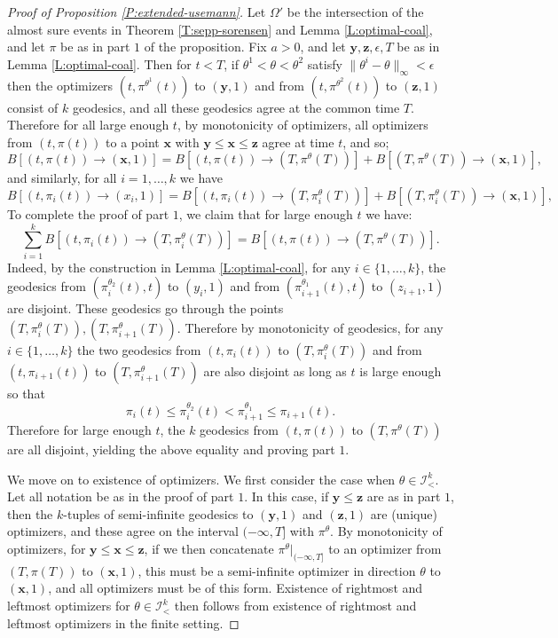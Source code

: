 \documentclass[11pt]{article}
\newcommand{\ep}{\epsilon}
\newcommand{\Om}{\Omega}
\newcommand{\cI}{\mathcal{I}}
\newcommand{\bx}{\mathbf{x}}
\newcommand{\by}{\mathbf{y}}
\newcommand{\bz}{\mathbf{z}}
\theoremstyle{definition} %
\theoremstyle{remark} %
\begin{document}
\begin{proof}[Proof of Proposition \ref{P:extended-usemann}]
	Let $\Om'$ be the intersection of the almost sure events in Theorem \ref{T:sepp-sorensen} and Lemma \ref{L:optimal-coal}, and let $\pi$ be as in part $1$ of the proposition. Fix $a > 0$, and let $\by, \bz, \ep, T$ be as in Lemma \ref{L:optimal-coal}. Then for $t < T$, if $\theta^1 < \theta < \theta^2$ satisfy $\|\theta^i - \theta\|_\infty < \ep$ then the optimizers $(t, \pi^{\theta^1}(t))$ to $(\by, 1)$ and from $(t, \pi^{\theta^2}(t))$ to $(\bz, 1)$ consist of $k$ geodesics, and all these geodesics agree at the common time $T$. Therefore for all large enough $t$, by monotonicity of optimizers, all optimizers from $(t, \pi(t))$ to a point $\bx$ with $\by \le \bx \le \bz$ agree at time $t$, and so;
	$$
	B[(t, \pi(t)) \to (\bx, 1)]  = B[(t, \pi(t)) \to (T, \pi^{\theta}(T))] + B[(T, \pi^{\theta}(T)) \to (\bx, 1)],
	$$
	and similarly, for all $i = 1, \dots, k$ we have
	$$
	B[(t, \pi_i(t)) \to (x_i, 1)]  = B[(t, \pi_i(t)) \to (T, \pi^{\theta}_i(T))] + B[(T, \pi^{\theta}_i(T)) \to (\bx, 1)],
	$$
	To complete the proof of part $1$, we claim that for large enough $t$ we have:
	$$
	\sum_{i=1}^k B[(t, \pi_i(t)) \to (T, \pi^{\theta}_i(T))] = B[(t, \pi(t)) \to (T, \pi^{\theta}(T))].
	$$
	Indeed, by the construction in Lemma \ref{L:optimal-coal}, for any $i \in \{1, \dots, k\}$, the geodesics from  $(\pi^{\theta_2}_i(t), t)$ to $(y_i, 1)$ and from $(\pi^{\theta_1}_{i+1}(t), t)$ to $(z_{i+1}, 1)$ are disjoint. These geodesics go through the points $(T, \pi^{\theta}_i(T)), (T, \pi^{\theta}_{i+1}(T))$. Therefore by monotonicity of geodesics, for any $i \in \{1, \dots, k\}$ the two geodesics from $(t, \pi_i(t))$ to $(T, \pi^{\theta}_i(T))$ and from $(t, \pi_{i+1}(t))$ to $(T, \pi^{\theta}_{i+1}(T))$ are also disjoint as long as $t$ is large enough so that
	$$
	\pi_i(t) \le \pi^{\theta_2}_i(t) < \pi^{\theta_1}_{i+1} \le \pi_{i+1}(t).
	$$
Therefore for large enough $t$, the $k$ geodesics from $(t, \pi(t))$ to $(T, \pi^{\theta}(T))$ are all disjoint, yielding the above equality and proving part $1$. 

We move on to existence of optimizers. We first consider the case when $\theta \in \cI^k_<$. Let all notation be as in the proof of part $1$.  In this case, if $\by \le \bz$ are as in part $1$, then the $k$-tuples of semi-infinite geodesics to $(\by, 1)$ and $(\bz, 1)$ are (unique) optimizers, and these agree on the interval $(-\infty, T]$ with $\pi^\theta$. By monotonicity of optimizers, for $\by \le \bx \le \bz$, if we then concatenate $\pi^\theta|_{(-\infty, T]}$ to an optimizer from $(T, \pi(T))$ to $(\bx, 1)$, this must be a semi-infinite optimizer in direction $\theta$ to $(\bx, 1)$, and all optimizers must be of this form. Existence of rightmost and leftmost optimizers for $\theta \in \cI^k_<$ then follows from existence of rightmost and leftmost optimizers in the finite setting.
	

\end{proof}
\end{document}
